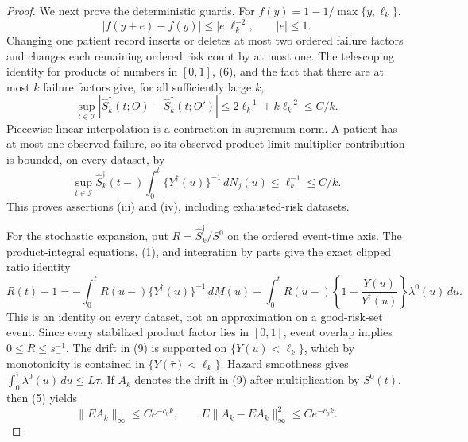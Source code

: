 \documentclass{article}
\begin{document}
\begin{proof}
We next prove the deterministic guards.  For
\(f(y)=1-1/\max\{y,\ell_k\}\),
\[
 |f(y+e)-f(y)|\leq |e|\ell_k^{-2},
 \qquad |e|\leq1.                                       \tag{6}
\]
Changing one patient record inserts or deletes at most two ordered failure
factors and changes each remaining ordered risk count by at most one.  The
telescoping identity for products of numbers in \([0,1]\), (6), and the fact
that there are at most \(k\) failure factors give, for all sufficiently large
\(k\),
\[
 \sup_{t\in\mathcal I}
 |\widehat S_k^\dagger(t;O)-\widehat S_k^\dagger(t;O')|
 \leq 2\ell_k^{-1}+k\ell_k^{-2}\leq C/k.                \tag{7}
\]
Piecewise-linear interpolation is a contraction in supremum norm.  A patient
has at most one observed failure, so its observed product-limit multiplier
contribution is bounded, on every dataset, by
\[
 \sup_{t\in\mathcal I}\widehat S_k^\dagger(t-)
 \int_0^t\{Y^\dagger(u)\}^{-1}\,dN_j(u)
 \leq\ell_k^{-1}\leq C/k.                               \tag{8}
\]
This proves assertions (iii) and (iv), including exhausted-risk datasets.

For the stochastic expansion, put \(R=\widehat S_k^\dagger/S^0\) on the
ordered event-time axis.  The product-integral equations, (1), and integration
by parts give the exact clipped ratio identity
\[
 R(t)-1
 =-\int_0^tR(u-)\{Y^\dagger(u)\}^{-1}\,dM(u)
  +\int_0^tR(u-)\left\{1-\frac{Y(u)}{Y^\dagger(u)}\right\}
             \lambda^0(u)\,du.                           \tag{9}
\]
This is an identity on every dataset, not an approximation on a good-risk-set
event.  Since every stabilized product factor lies in \([0,1]\), event overlap
implies \(0\leq R\leq s_-^{-1}\).  The drift in (9) is supported on
\(\{Y(u)<\ell_k\}\), which by monotonicity is contained in
\(\{Y(\bar\tau)<\ell_k\}\).  Hazard smoothness gives
\(\int_0^{\bar\tau}\lambda^0(u)\,du\leq L\bar\tau\).
If \(A_k\) denotes the drift in (9) after multiplication by \(S^0(t)\),
then (5) yields
\[
 \|EA_k\|_\infty\leq Ce^{-c_0k},
 \qquad
 E\|A_k-EA_k\|_\infty^2\leq Ce^{-c_0k}.                \tag{10}
\]


\end{proof}
\end{document}
